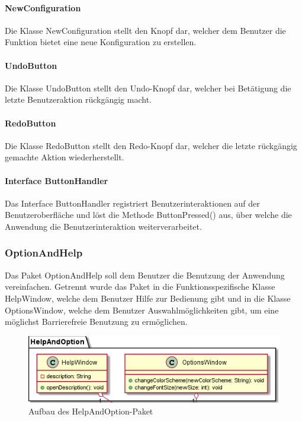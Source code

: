 \documentclass[parskip=full]{scrartcl}
\begin{document}
\paragraph{NewConfiguration}

Die Klasse NewConfiguration stellt den Knopf dar, welcher dem Benutzer die Funktion bietet eine neue Konfiguration zu erstellen.

\paragraph{UndoButton}

Die Klasse UndoButton stellt den Undo-Knopf dar, welcher bei Betätigung die letzte Benutzeraktion rückgängig macht.

\paragraph{RedoButton}

Die Klasse RedoButton stellt den Redo-Knopf dar, welcher die letzte rückgängig gemachte Aktion wiederherstellt.

\paragraph{Interface ButtonHandler}

Das Interface ButtonHandler registriert Benutzerinteraktionen auf der Benutzeroberfläche und löst die Methode ButtonPressed() aus, über welche die Anwendung die Benutzerinteraktion weiterverarbeitet.

\subsubsection{OptionAndHelp}

Das Paket OptionAndHelp soll dem Benutzer die Benutzung der Anwendung vereinfachen. Getrennt wurde das Paket in die Funktionsspezifische Klasse HelpWindow, welche dem Benutzer Hilfe zur Bedienung gibt und in die Klasse OptionsWindow, welche dem Benutzer Auswahlmöglichkeiten gibt, um eine möglichst Barrierefreie Benutzung zu ermöglichen.

\begin{figure}[htbp]
	\begin{center}
		\includegraphics[width = 14cm]{Grafiken/HelpAndOptionNamespace.png}
		\caption{Aufbau des HelpAndOption-Paket}
		\label{Entwurf_Grob}
	\end{center}
\end{figure}
\end{document}
